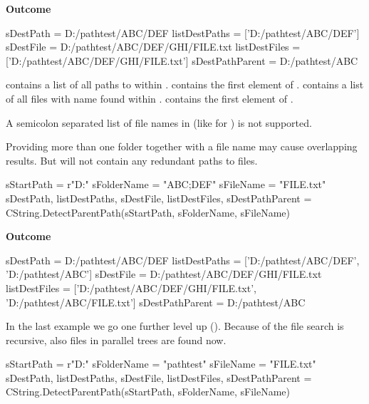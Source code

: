 \textbf{Outcome}

\begin{pythonlog}
sDestPath       = D:/pathtest/ABC/DEF
listDestPaths   = ['D:/pathtest/ABC/DEF']
sDestFile       = D:/pathtest/ABC/DEF/GHI/FILE.txt
listDestFiles   = ['D:/pathtest/ABC/DEF/GHI/FILE.txt']
sDestPathParent = D:/pathtest/ABC
\end{pythonlog}

 contains a list of all paths to  within .
 contains the first element of .
 contains a list of all files with name  found within .
 contains the first element of .

A semicolon separated list of file names in  (like for ) is not supported.

Providing more than one folder together with a file name may cause overlapping results. But  will not contain
any redundant paths to files.

\begin{pythoncode}
sStartPath  = r"D:\pathtest\ABC\DEF\GHI"
sFolderName = "ABC;DEF"
sFileName   = "FILE.txt"
sDestPath, listDestPaths, sDestFile, listDestFiles, sDestPathParent = CString.DetectParentPath(sStartPath, sFolderName, sFileName)
\end{pythoncode}

\textbf{Outcome}

\begin{pythonlog}
sDestPath       = D:/pathtest/ABC/DEF
listDestPaths   = ['D:/pathtest/ABC/DEF', 'D:/pathtest/ABC']
sDestFile       = D:/pathtest/ABC/DEF/GHI/FILE.txt
listDestFiles   = ['D:/pathtest/ABC/DEF/GHI/FILE.txt', 'D:/pathtest/ABC/FILE.txt']
sDestPathParent = D:/pathtest/ABC
\end{pythonlog}

In the last example we go one further level up (). Because of the file search is recursive, also files in parallel trees are found now.

\begin{pythoncode}
sStartPath  = r"D:\pathtest\ABC\DEF\GHI"
sFolderName = "pathtest"
sFileName   = "FILE.txt"
sDestPath, listDestPaths, sDestFile, listDestFiles, sDestPathParent = CString.DetectParentPath(sStartPath, sFolderName, sFileName)
\end{pythoncode}

